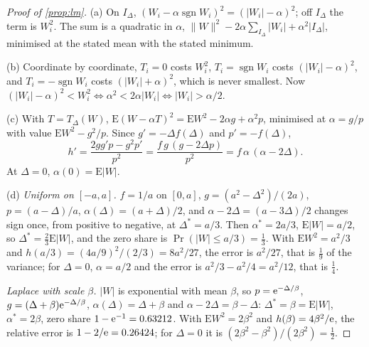 \documentclass[11pt]{article}
\theoremstyle{definition}\newtheorem{definition}[theorem]{Definition}
\theoremstyle{remark}\newtheorem{remark}[theorem]{Remark}
\newcommand{\sgn}{\operatorname{sgn}}
\begin{document}
\begin{proof}[Proof of \cref{prop:lm}]
(a) On $I_\Delta$, $(W_i-\alpha\sgn W_i)^2=(|W_i|-\alpha)^2$; off $I_\Delta$ the term is $W_i^2$. The sum is a quadratic in $\alpha$, $\|W\|^2-2\alpha\sum_{I_\Delta}|W_i|+\alpha^2|I_\Delta|$, minimised at the stated mean with the stated minimum.

(b) Coordinate by coordinate, $T_i=0$ costs $W_i^2$, $T_i=\sgn W_i$ costs $(|W_i|-\alpha)^2$, and $T_i=-\sgn W_i$ costs $(|W_i|+\alpha)^2$, which is never smallest. Now $(|W_i|-\alpha)^2<W_i^2\iff\alpha^2<2\alpha|W_i|\iff|W_i|>\alpha/2$.

(c) With $T=T_\Delta(W)$, $\mathrm E(W-\alpha T)^2=\mathrm EW^2-2\alpha g+\alpha^2p$, minimised at $\alpha=g/p$ with value $\mathrm EW^2-g^2/p$. Since $g'=-\Delta f(\Delta)$ and $p'=-f(\Delta)$,
\[
h'=\frac{2gg'p-g^2p'}{p^2}=\frac{f\,g\,(g-2\Delta p)}{p^2}=f\,\alpha\,(\alpha-2\Delta).
\]
At $\Delta=0$, $\alpha(0)=\mathrm E|W|$.

(d) \emph{Uniform on $[-a,a]$.} $f=1/a$ on $[0,a]$, $g=(a^2-\Delta^2)/(2a)$, $p=(a-\Delta)/a$, $\alpha(\Delta)=(a+\Delta)/2$, and $\alpha-2\Delta=(a-3\Delta)/2$ changes sign once, from positive to negative, at $\Delta^*=a/3$. Then $\alpha^*=2a/3$, $\mathrm E|W|=a/2$, so $\Delta^*=\frac23\mathrm E|W|$, and the zero share is $\Pr(|W|\le a/3)=\frac13$. With $\mathrm EW^2=a^2/3$ and $h(a/3)=(4a/9)^2/(2/3)=8a^2/27$, the error is $a^2/27$, that is $\frac19$ of the variance; for $\Delta=0$, $\alpha=a/2$ and the error is $a^2/3-a^2/4=a^2/12$, that is $\frac14$.

\emph{Laplace with scale $\beta$.} $|W|$ is exponential with mean $\beta$, so $p=\mathrm e^{-\Delta/\beta}$, $g=(\Delta+\beta)\mathrm e^{-\Delta/\beta}$, $\alpha(\Delta)=\Delta+\beta$ and $\alpha-2\Delta=\beta-\Delta$: $\Delta^*=\beta=\mathrm E|W|$, $\alpha^*=2\beta$, zero share $1-\mathrm e^{-1}=0.63212$. With $\mathrm EW^2=2\beta^2$ and $h(\beta)=4\beta^2/\mathrm e$, the relative error is $1-2/\mathrm e=0.26424$; for $\Delta=0$ it is $(2\beta^2-\beta^2)/(2\beta^2)=\frac12$.


\end{proof}
\end{document}
